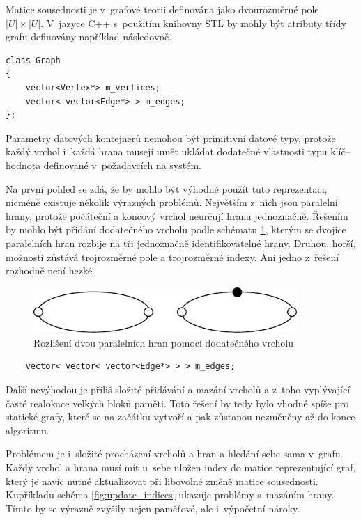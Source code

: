\documentclass[11pt,twoside,a4paper]{book}
\begin{document}
Matice sousednosti je v~grafové teorii definována jako dvourozměrné pole $|U| \times |U|$. V~jazyce C++ s~použitím knihovny STL by mohly být atributy třídy grafu definovány například následovně.

\begin{verbatim}
class Graph
{
    vector<Vertex*> m_vertices;
    vector< vector<Edge*> > m_edges;
};
\end{verbatim}

Parametry datových kontejnerů nemohou být primitivní datové typy, protože každý vrchol i~každá hrana musejí umět ukládat dodatečné vlastnosti typu klíč--hodnota definované v~požadavcích na systém.

Na první pohled se zdá, že by mohlo být výhodné použít tuto reprezentaci, nicméně existuje několik výrazných problémů. Největším z~nich jsou paralelní hrany, protože počáteční a koncový vrchol neurčují hranu jednoznačně. Řešením by mohlo být přidání dodatečného vrcholu podle schématu \ref{fig:parallel_edges}, kterým se dvojice paralelních hran rozbije na tři jednoznačně identifikovatelné hrany. Druhou, horší, možností zůstává trojrozměrné pole a trojrozměrné indexy. Ani jedno z~řešení rozhodně není hezké.

\begin{figure}[ht]
\begin{center}
\includegraphics[width=10cm]{img/parallel_edges.pdf}
\caption{Rozlišení dvou paralelních hran pomocí dodatečného vrcholu}
\label{fig:parallel_edges}
\end{center}
\end{figure}

\begin{verbatim}
    vector< vector< vector<Edge*> > > m_edges;
\end{verbatim}

Další nevýhodou je příliš složité přidávání a mazání vrcholů a z~toho vyplývající časté realokace velkých bloků paměti. Toto řešení by tedy bylo vhodné spíše pro statické grafy, které se na začátku vytvoří a pak zůstanou nezměněny až do konce algoritmu.

Problémem je i~složité procházení vrcholů a hran a hledání sebe sama v~grafu. Každý vrchol a hrana musí mít u~sebe uložen index do matice reprezentující graf, který je navíc nutné aktualizovat při libovolné změně matice sousednosti. Kupříkladu schéma \ref{fig:update_indices} ukazuje problémy s~mazáním hrany. Tímto by se výrazně zvýšily nejen paměťové, ale i~výpočetní nároky.
\end{document}
